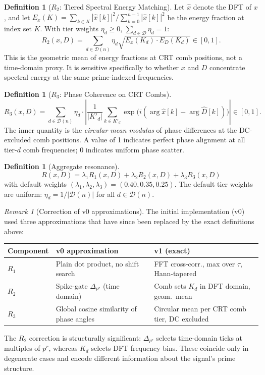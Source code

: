 \documentclass[11pt,a4paper]{article}
\theoremstyle{plain}
\theoremstyle{definition}
\newtheorem{definition}[theorem]{Definition}
\theoremstyle{remark}
\newtheorem{remark}[theorem]{Remark}
\newcommand{\tiers}{\mathcal{D}}
\begin{document}
\begin{definition}[$R_2$: Tiered Spectral Energy Matching]
  Let $\hat{x}$ denote the DFT of $x$, and let
  $E_x(K) = \sum_{k \in K} |\hat{x}[k]|^2 / \sum_{k=0}^{n-1} |\hat{x}[k]|^2$
  be the energy fraction at index set $K$. With tier weights $\eta_d \ge 0$,
  $\sum_{d \in \tiers} \eta_d = 1$:
  \[
    R_2(x, D) = \sum_{d \in \tiers(n)} \eta_d \sqrt{E_x(K_d) \cdot E_D(K_d)} \in [0,1].
  \]
  This is the geometric mean of energy fractions at CRT comb positions, not
  a time-domain proxy. It is sensitive specifically to whether $x$ and $D$
  concentrate spectral energy at the same prime-indexed frequencies.
\end{definition}

\begin{definition}[$R_3$: Phase Coherence on CRT Combs]
  \[
    R_3(x, D) = \sum_{d \in \tiers(n)} \eta_d \cdot
    \left\lvert \frac{1}{|K'_d|} \sum_{k \in K'_d}
    \exp\!\bigl(i(\arg \hat{x}[k] - \arg \hat{D}[k])\bigr) \right\rvert \in [0,1].
  \]
  The inner quantity is the \emph{circular mean modulus} of phase differences at the
  DC-excluded comb positions. A value of 1 indicates perfect phase alignment at all
  tier-$d$ comb frequencies; 0 indicates uniform phase scatter.
\end{definition}

\begin{definition}[Aggregate resonance]
  \[
    \boxed{R(x, D) = \lambda_1 R_1(x, D) + \lambda_2 R_2(x, D) + \lambda_3 R_3(x, D)}
  \]
  with default weights $(\lambda_1, \lambda_2, \lambda_3) = (0.40, 0.35, 0.25)$.
  The default tier weights are uniform: $\eta_d = 1/|\tiers(n)|$ for all $d \in \tiers(n)$.
\end{definition}

\begin{remark}[Correction of v0 approximations]
  The initial implementation (v0) used three approximations that have since been
  replaced by the exact definitions above:
  \begin{center}
  \begin{tabular}{lll}
    \toprule
    Component & v0 approximation & v1 (exact) \\
    \midrule
    $R_1$ & Plain dot product, no shift search & FFT cross-corr., max over $\tau$, Hann-tapered \\
    $R_2$ & Spike-gate $\Delta_{p^r}$ (time domain) & Comb sets $K_d$ in DFT domain, geom.~mean \\
    $R_3$ & Global cosine similarity of phase angles & Circular mean per CRT comb tier, DC excluded \\
    \bottomrule
  \end{tabular}
  \end{center}
  The $R_2$ correction is structurally significant: $\Delta_{p^r}$ selects time-domain
  ticks at multiples of $p^r$, whereas $K_d$ selects DFT frequency bins. These coincide
  only in degenerate cases and encode different information about the signal's prime structure.
\end{remark}
\end{document}
